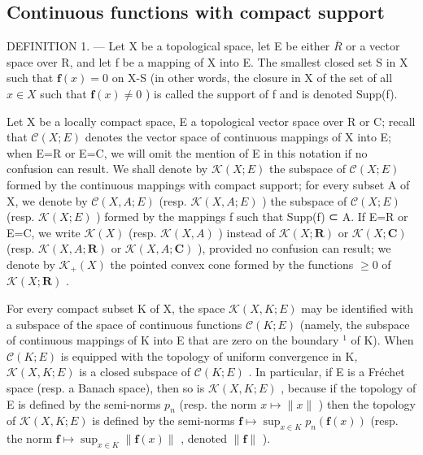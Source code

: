 \subsection{Continuous functions with compact support}

DEFINITION 1. --- Let X be a topological space, let E be either \(\overline{R}\) or a vector space over R, and let f be a mapping of X into E. The smallest closed set S in X such that \(\mathbf{f}(x)=0\) on X-S (in other words, the closure in X of the set of all \(x\in X\) such that \(\mathbf{f}(x)\neq0\) ) is called the support of f and is denoted Supp(f).

Let X be a locally compact space, E a topological vector space over R or C; recall that \(\mathcal{C}(X;E)\) denotes the vector space of continuous mappings of X into E; when E=R or E=C, we will omit the mention of E in this notation if no confusion can result. We shall denote by \(\mathcal{K}(X;E)\) the subspace of \(\mathcal{C}(X;E)\) formed by the continuous mappings with compact support; for every subset A of X, we denote by \(\mathcal{C}(X,A;E)\) (resp. \(\mathcal{K}(X,A;E)\) ) the subspace of \(\mathcal{C}(X;E)\) (resp. \(\mathcal{K}(X;E)\) ) formed by the mappings f such that Supp(f) ⊂ A. If E=R or E=C, we write \(\mathcal{K}(X)\) (resp. \(\mathcal{K}(X,A)\) ) instead of \(\mathcal{K}(X;\mathbf{R})\) or \(\mathcal{K}(X;\mathbf{C})\) (resp. \(\mathcal{K}(X,A;\mathbf{R})\) or \(\mathcal{K}(X,A;\mathbf{C})\) ), provided no confusion can result; we denote by \(\mathcal{K}_{+}(X)\) the pointed convex cone formed by the functions \(\geqslant0\) of \(\mathcal{K}(X;\mathbf{R})\) .

For every compact subset K of X, the space \(\mathcal{K}(X,K;E)\) may be identified with a subspace of the space of continuous functions \(\mathcal{C}(K;E)\) (namely, the subspace of continuous mappings of K into E that are zero on the boundary \(^{1}\) of K). When \(\mathcal{C}(K;E)\) is equipped with the topology of uniform convergence in K, \(\mathcal{K}(X,K;E)\) is a closed subspace of \(\mathcal{C}(K;E)\) . In particular, if E is a Fréchet space (resp. a Banach space), then so is \(\mathcal{K}(X,K;E)\) , because if the topology of E is defined by the semi-norms \(p_{n}\) (resp. the norm \(x \mapsto \|x\|\) ) then the topology of \(\mathcal{K}(X,K;E)\) is defined by the semi-norms \(\mathbf{f} \mapsto \sup_{x \in K} p_n(\mathbf{f}(x))\) (resp. the norm \(\mathbf{f} \mapsto \sup_{x \in K} \| \mathbf{f}(x) \|\) , denoted \(\| \mathbf{f} \|\) ).

